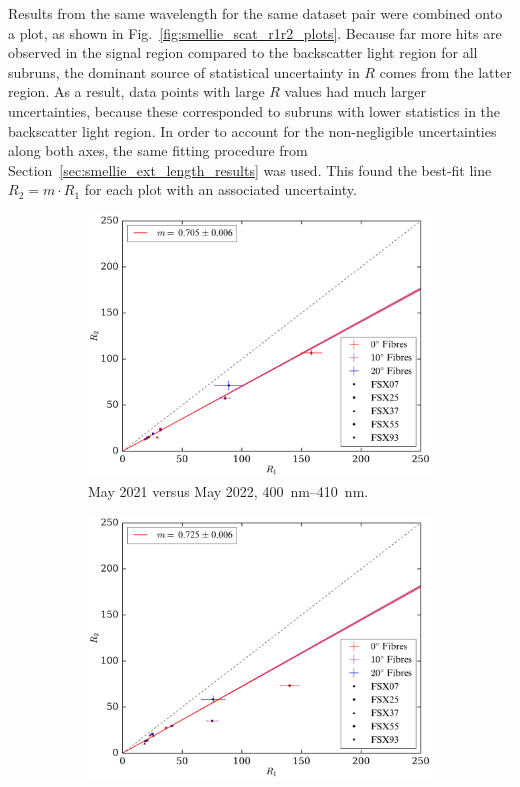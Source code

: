 Results from the same wavelength for the same dataset pair were combined onto a plot, as shown in Fig.~\ref{fig:smellie_scat_r1r2_plots}. Because far more hits are observed in the signal region compared to the backscatter light region for all subruns, the dominant source of statistical uncertainty in $R$ comes from the latter region. As a result, data points with large $R$ values had much larger uncertainties, because these corresponded to subruns with lower statistics in the backscatter light region. In order to account for the non-negligible uncertainties along both axes, the same fitting procedure from Section~\ref{sec:smellie_ext_length_results} was used. This found the best-fit line $R_{2} = m\cdot R_{1}$ for each plot with an associated uncertainty.

\begin{figure}
    \centering
    \begin{subfigure}{0.48\textwidth}
        \centering
        \includegraphics[width=\textwidth]{5_SMELLIEAnalysis/images/R1_vs_R2_superK_400_410_May2022.pdf}
        \caption{May 2021 versus May 2022, \SIrange{400}{410}{\nm}.}
        \label{fig:smellie_scat_r1r2_sk405_may22}
    \end{subfigure}
    \begin{subfigure}{0.48\textwidth}
        \centering
        \includegraphics[width=\textwidth]{5_SMELLIEAnalysis/images/R1_vs_R2_superK_400_410_Jun2023.pdf}

\end{subfigure}
\end{figure}
